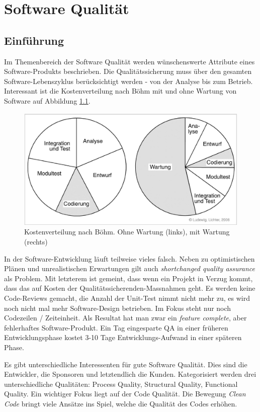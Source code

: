 \chapter{Software Qualität}

\section{Einführung}

Im Themenbereich der Software Qualität werden wünschenswerte Attribute eines Software-Produkts beschrieben. Die Qualitätssicherung muss über den gesamten Software-Lebenszyklus berücksichtigt werden - von der Analyse bis zum Betrieb. Interessant ist die Kostenverteilung nach Böhm mit und ohne Wartung von Software auf Abbildung \ref{fig:kostenverteilung-sw-entwicklung-nach-boehm}.

\begin{figure}[h!]
\centering
\includegraphics[width=0.8\linewidth]{fig/kostenverteilung-sw-entwicklung-nach-boehm}
\caption{Kostenverteilung nach Böhm. Ohne Wartung (links), mit Wartung (rechts)}
\label{fig:kostenverteilung-sw-entwicklung-nach-boehm}
\end{figure}

In der Software-Entwicklung läuft teilweise vieles falsch. Neben zu optimistischen Plänen und unrealistischen Erwartungen gilt auch \emph{shortchanged quality assurance} als Problem. Mit letzterem ist gemeint, dass wenn ein Projekt in Verzug kommt, dass das auf Kosten der Qualitätssicherenden-Massnahmen geht. Es werden keine Code-Reviews gemacht, die Anzahl der Unit-Test nimmt nicht mehr zu, es wird noch nicht mal mehr Software-Design betrieben. Im Fokus steht nur noch Codezeilen / Zeiteinheit. Als Resultat hat man zwar ein \emph{feature complete}, aber fehlerhaftes Software-Produkt. Ein Tag eingesparte QA in einer früheren Entwicklungsphase kostet 3-10 Tage Entwicklungs-Aufwand in einer späteren Phase.

Es gibt unterschiedliche Interessenten für gute Software Qualität. Dies sind die Entwickler, die Sponsoren und letztendlich die Kunden. Kategorisiert werden drei unterschiedliche Qualitäten: Process Quality, Structural Quality, Functional Quality. Ein wichtiger Fokus liegt auf der Code Qualität. Die Bewegung \emph{Clean Code} bringt viele Ansätze ins Spiel, welche die Qualität des Codes erhöhen.


